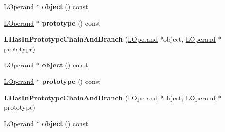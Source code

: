 \begin{DoxyCompactItemize}
\item 
\hyperlink{classv8_1_1internal_1_1_l_operand}{L\+Operand} $\ast$ {\bfseries object} () const \hypertarget{classv8_1_1internal_1_1_l_has_in_prototype_chain_and_branch_a495e5c90fae5975c86c05b81abc64eb7}{}\label{classv8_1_1internal_1_1_l_has_in_prototype_chain_and_branch_a495e5c90fae5975c86c05b81abc64eb7}

\item 
\hyperlink{classv8_1_1internal_1_1_l_operand}{L\+Operand} $\ast$ {\bfseries prototype} () const \hypertarget{classv8_1_1internal_1_1_l_has_in_prototype_chain_and_branch_a064d5fd47ecfd5cadfaf5453641d0217}{}\label{classv8_1_1internal_1_1_l_has_in_prototype_chain_and_branch_a064d5fd47ecfd5cadfaf5453641d0217}

\item 
{\bfseries L\+Has\+In\+Prototype\+Chain\+And\+Branch} (\hyperlink{classv8_1_1internal_1_1_l_operand}{L\+Operand} $\ast$object, \hyperlink{classv8_1_1internal_1_1_l_operand}{L\+Operand} $\ast$prototype)\hypertarget{classv8_1_1internal_1_1_l_has_in_prototype_chain_and_branch_a986107e75af400f0ecb8ad0edc1d6c17}{}\label{classv8_1_1internal_1_1_l_has_in_prototype_chain_and_branch_a986107e75af400f0ecb8ad0edc1d6c17}

\item 
\hyperlink{classv8_1_1internal_1_1_l_operand}{L\+Operand} $\ast$ {\bfseries object} () const \hypertarget{classv8_1_1internal_1_1_l_has_in_prototype_chain_and_branch_a495e5c90fae5975c86c05b81abc64eb7}{}\label{classv8_1_1internal_1_1_l_has_in_prototype_chain_and_branch_a495e5c90fae5975c86c05b81abc64eb7}

\item 
\hyperlink{classv8_1_1internal_1_1_l_operand}{L\+Operand} $\ast$ {\bfseries prototype} () const \hypertarget{classv8_1_1internal_1_1_l_has_in_prototype_chain_and_branch_a064d5fd47ecfd5cadfaf5453641d0217}{}\label{classv8_1_1internal_1_1_l_has_in_prototype_chain_and_branch_a064d5fd47ecfd5cadfaf5453641d0217}

\item 
{\bfseries L\+Has\+In\+Prototype\+Chain\+And\+Branch} (\hyperlink{classv8_1_1internal_1_1_l_operand}{L\+Operand} $\ast$object, \hyperlink{classv8_1_1internal_1_1_l_operand}{L\+Operand} $\ast$prototype)\hypertarget{classv8_1_1internal_1_1_l_has_in_prototype_chain_and_branch_a986107e75af400f0ecb8ad0edc1d6c17}{}\label{classv8_1_1internal_1_1_l_has_in_prototype_chain_and_branch_a986107e75af400f0ecb8ad0edc1d6c17}

\item 
\hyperlink{classv8_1_1internal_1_1_l_operand}{L\+Operand} $\ast$ {\bfseries object} () const \hypertarget{classv8_1_1internal_1_1_l_has_in_prototype_chain_and_branch_a495e5c90fae5975c86c05b81abc64eb7}{}\label{classv8_1_1internal_1_1_l_has_in_prototype_chain_and_branch_a495e5c90fae5975c86c05b81abc64eb7}


\end{DoxyCompactItemize}
